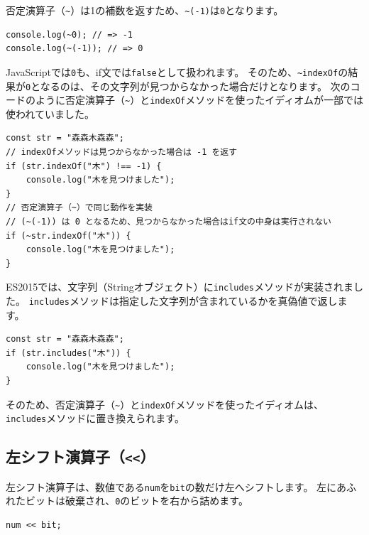 否定演算子（\lstinline{~}）は1の補数を返すため、\lstinline{~(-1)}は\texttt{0}となります。

\begin{lstlisting}
console.log(~0); // => -1
console.log(~(-1)); // => 0
\end{lstlisting}

JavaScriptでは\texttt{0}も、if文では\texttt{false}として扱われます。
そのため、\lstinline{~indexOf}の結果が\texttt{0}となるのは、その文字列が見つからなかった場合だけとなります。
次のコードのように否定演算子（\lstinline{~}）と\texttt{indexOf}メソッドを使ったイディオムが一部では使われていました。

\begin{lstlisting}
const str = "森森木森森";
// indexOfメソッドは見つからなかった場合は -1 を返す
if (str.indexOf("木") !== -1) {
    console.log("木を見つけました");
}
// 否定演算子（~）で同じ動作を実装
// (~(-1)) は 0 となるため、見つからなかった場合はif文の中身は実行されない
if (~str.indexOf("木")) {
    console.log("木を見つけました");
}
\end{lstlisting}

ES2015では、文字列（Stringオブジェクト）に\texttt{includes}メソッドが実装されました。
\texttt{includes}メソッドは指定した文字列が含まれているかを真偽値で返します。

\begin{lstlisting}
const str = "森森木森森";
if (str.includes("木")) {
    console.log("木を見つけました");
}
\end{lstlisting}

そのため、否定演算子（\lstinline{~}）と\texttt{indexOf}メソッドを使ったイディオムは、\texttt{includes}メソッドに置き換えられます。

\hypertarget{left-shift}{%
\subsection{\texorpdfstring{左シフト演算子（\texttt{\textless{}\textless{}}）}{左シフト演算子（\textless{}\textless{}）}}\label{left-shift}}

左シフト演算子は、数値である\texttt{num}を\texttt{bit}の数だけ左へシフトします。
左にあふれたビットは破棄され、\texttt{0}のビットを右から詰めます。

\begin{lstlisting}
num << bit;
\end{lstlisting}

